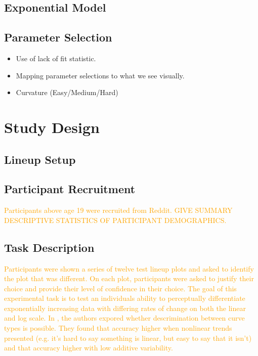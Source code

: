 \documentclass[]{interact}
\theoremstyle{plain}%
\theoremstyle{definition}
\theoremstyle{remark}
\def\tightlist{}
\begin{document}
\hypertarget{exponential-model}{%
\subsection{Exponential Model}\label{exponential-model}}

\textcolor{Orange}{}

\hypertarget{parameter-selection}{%
\subsection{Parameter Selection}\label{parameter-selection}}

\begin{itemize}
\tightlist
\item
  Use of lack of fit statistic.
\item
  Mapping parameter selections to what we see visually.
\item
  Curvature (Easy/Medium/Hard)
\end{itemize}

\hypertarget{study-design}{%
\section{Study Design}\label{study-design}}

\hypertarget{lineup-setup}{%
\subsection{Lineup Setup}\label{lineup-setup}}

\hypertarget{participant-recruitment}{%
\subsection{Participant Recruitment}\label{participant-recruitment}}

\textcolor{Orange}{Participants above age 19 were recruited from Reddit. 
GIVE SUMMARY DESCRIPTIVE STATISTICS OF PARTICIPANT DEMOGRAPHICS.}

\hypertarget{task-description}{%
\subsection{Task Description}\label{task-description}}

\textcolor{Orange}{Participants were shown a series of twelve test lineup plots and asked to identify the plot that was different. 
On each plot, participants were asked to justify their choice and provide their level of confidence in their choice.
The goal of this experimental task is to test an individuals ability to perceptually differentiate exponentially increasing data with differing rates of change on both the linear and log scale. 
In \cite{best_perception_2007}, the authors expored whether descrimination between curve types is possible. 
They found that accuracy higher when nonlinear trends presented (e.g. it’s hard to say something is linear, but easy to say that it isn’t) and that accuracy higher with low additive variability.
}
\end{document}

